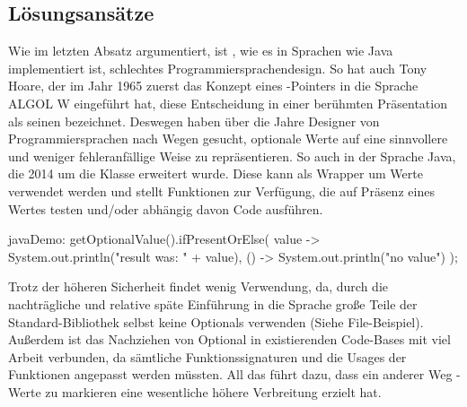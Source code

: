 \subsection{Lösungsansätze}
Wie im letzten Absatz argumentiert, ist , wie es in Sprachen wie Java implementiert ist, schlechtes
Programmiersprachendesign.
So hat auch Tony Hoare, der im Jahr 1965 zuerst das Konzept eines -Pointers in die Sprache ALGOL W
eingeführt hat, diese Entscheidung in einer berühmten Präsentation als seinen  bezeichnet.
Deswegen haben über die Jahre Designer von Programmiersprachen nach Wegen gesucht, optionale Werte auf eine sinnvollere
und weniger fehleranfällige Weise zu repräsentieren.
So auch in der Sprache Java, die 2014 um die  Klasse erweitert wurde.
Diese kann als Wrapper um Werte verwendet werden und stellt Funktionen zur Verfügung, die auf Präsenz eines Wertes
testen und/oder abhängig davon Code ausführen.

\begin{codeBlock}{java}{Demo: }
getOptionalValue().ifPresentOrElse(
    value -> System.out.println("result was: " + value),
    () -> System.out.println("no value")
);
\end{codeBlock}

Trotz der höheren Sicherheit findet  wenig Verwendung, da, durch die nachträgliche und relative
späte Einführung in die Sprache große Teile der Standard-Bibliothek selbst keine Optionals verwenden (Siehe
File-Beispiel).
Außerdem ist das Nachziehen von Optional in existierenden Code-Bases mit viel Arbeit verbunden, da sämtliche
Funktionssignaturen und die Usages der Funktionen angepasst werden müssten.
All das führt dazu, dass ein anderer Weg -Werte zu markieren eine wesentliche höhere Verbreitung
erzielt hat.

